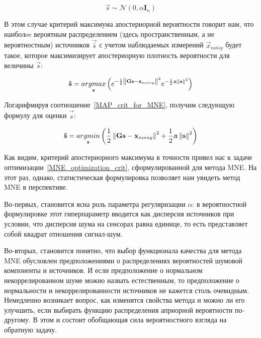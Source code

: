 \begin{equation}
    \vec{s} \sim \mathcal{N}(0, \alpha\mathbf{I}_n)
\end{equation}

В этом случае критерий максимума апостериорной вероятности говорит нам, что
наиболee вероятным распределением (здесь пространственным, а не вероятностным)
источников $\vec{\hat{s}}$ с учетом наблюдаемых измерений
$\vec{x}_{noisy}$ будет такое, которое максимизирует апостериорную
плотность вероятности для величины $\vec{s}$:

\begin{equation}
    \mathbf{\hat{s}} =
    \underset{\mathbf{s}}{argmax} \left(
        e^{-\frac{1}{2}\left\lVert\mathbf{Gs - x}_{noisy}\right\rVert^2} e^{-\frac{1}{2}\upalpha\left\lVert\mathbf{s}\right\rVert^2}
    \right)
    \label{MAP_crit_for_MNE}
\end{equation}

Логарифмируя соотношение~\ref{MAP_crit_for_MNE}, получим следующую формулу
для оценки $\vec{\hat{s}}$:

\begin{equation}
    \mathbf{\hat{s}} =
    \underset{\mathbf{s}}{argmin} \left(
        \frac{1}{2}\left\lVert\mathbf{Gs - x}_{noisy}\right\rVert^2 + \frac{1}{2}\upalpha\left\lVert\mathbf{s}\right\rVert^2
    \right)
    \label{logMAP_crit_for_MNE}
\end{equation}

Как видим, критерий апостериорного максимума в точности привел нас
к задаче оптимизации~\ref{MNE_optimization_crit}, сформулированной для
метода MNE. На этот раз, однако, статистическая формулировка позволяет
нам увидеть метод MNE в перспективе.

Во-первых, становится ясна роль параметра регуляризации $\alpha$:
в вероятностной формулировке этот гиперпараметр вводится как дисперсия
источников при условии, что дисперсия шума на сенсорах равна единице,
то есть представляет собой квадрат отношения сигнал-шум.

Во-вторых, становится понятно, что выбор функционала качества для метода MNE
обусловлен предположениями о распределениях вероятностей шумовой компоненты и
источников. И если предположение о нормальном некоррелированном шуме можно
назвать естественным, то предположение о нормальности и некоррелированности
источников не кажется столь очевидным.  Немедленно возникает вопрос, как
изменятся свойства метода и можно ли его улучшить, если выбирать функцию
распределения априорной вероятности по-другому. В этом и состоит обобщающая
сила вероятностного взгляда на обратную задачу.


